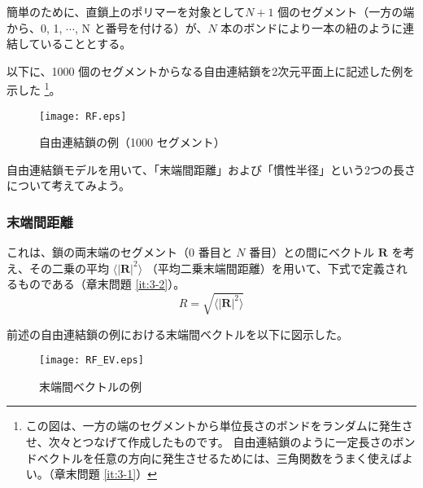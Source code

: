 \documentclass[a4paper,11pt]{jlreq}
\begin{document}
簡単のために、直鎖上のポリマーを対象として$N+1$ 個のセグメント（一方の端から、0, 1, $\cdots$, N と番号を付ける）が、$N$ 本のボンドにより一本の紐のように連結していることとする。

以下に、1000 個のセグメントからなる自由連結鎖を2次元平面上に記述した例を示した
\footnote
{
この図は、一方の端のセグメントから単位長さのボンドをランダムに発生させ、次々とつなげて作成したものです。
自由連結鎖のように一定長さのボンドベクトルを任意の方向に発生させるためには、三角関数をうまく使えばよい。（章末問題 \ref{it:3-1}）
}。
\begin{figure}[htb]
	\begin{center}
		\texttt{[image: RF.eps]}
		\caption{自由連結鎖の例（1000 セグメント）}
		\label{fig: RF}
	\end{center}
\end{figure}

自由連結鎖モデルを用いて、「末端間距離」および「慣性半径」という2つの長さについて考えてみよう。

\subsubsection{末端間距離}

これは、鎖の両末端のセグメント（0 番目と $N$ 番目）との間にベクトル $\bm{R}$ を考え、その二乗の平均 $\langle |\bm{R}|^2 \rangle$ （平均二乗末端間距離）を用いて、下式で定義されるものである（章末問題 \ref{it:3-2}）。
\begin{equation}
R=\sqrt{\langle |\bm{R}|^2 \rangle}
\end{equation}

前述の自由連結鎖の例における末端間ベクトルを以下に図示した。
\begin{figure}[htb]
	\begin{center}
		\texttt{[image: RF\_EV.eps]}
		\caption{末端間ベクトルの例}
		\label{fig: RF_EV}
	\end{center}
\end{figure}
\end{document}
